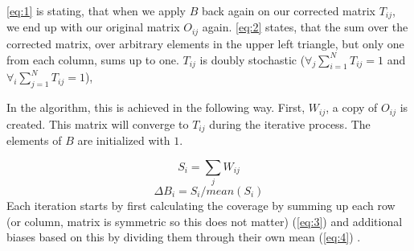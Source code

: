 
\eqref{eq:1} is stating, that when we apply $B$ back again on our corrected
matrix $T_{ij}$, we end up with our original matrix $O_{ij}$ again.
\eqref{eq:2} states, that the sum over the corrected matrix, over arbitrary
elements in the upper left triangle, but only one from each column, sums up to
one. $T_{ij}$ is doubly stochastic ($\forall_j\sum^N_{i=1}T_{ij} = 1$ and
$\forall_i\sum^N_{j=1}T_{ij} = 1$), 


In the algorithm, this is achieved in the following way. First, $W_{ij}$, a
copy of $O_{ij}$ is created. This matrix will converge to $T_{ij}$ during the
iterative process. The elements of $B$ are initialized with $1$.


\begin{equation}\label{eq:3}
    S_i = \sum_j W_{ij}
\end{equation}
\begin{equation}\label{eq:4}
    \Delta B_i = S_i / mean(S_i)
\end{equation}
Each iteration starts by first calculating the coverage by summing up each row
(or column, matrix is symmetric so this does not matter) (\eqref{eq:3}) and
additional biases based on this by dividing them through their own mean
(\eqref{eq:4}) .

